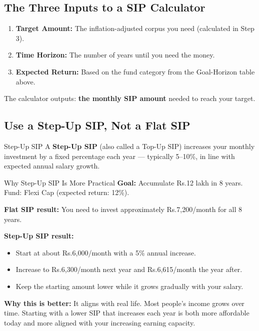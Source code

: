 \documentclass[12pt,a4paper]{article}
\makeatletter
\newcommand{\rupee}{\ifmmode\text{Rs.}\else Rs.\@\fi}
\makeatother
\begin{document}
\subsection{The Three Inputs to a SIP Calculator}

\begin{enumerate}[label=\textbf{\arabic*.}]
  \item \textbf{Target Amount:} The inflation-adjusted corpus you need (calculated in Step 3).
  \item \textbf{Time Horizon:} The number of years until you need the money.
  \item \textbf{Expected Return:} Based on the fund category from the Goal-Horizon table above.
\end{enumerate}

The calculator outputs: \textbf{the monthly SIP amount} needed to reach your target.

\subsection{Use a Step-Up SIP, Not a Flat SIP}

\begin{definitionbox}{Step-Up SIP}
A \textbf{Step-Up SIP} (also called a Top-Up SIP) increases your monthly investment by a fixed percentage each year --- typically 5--10\%, in line with expected annual salary growth.
\end{definitionbox}

\begin{examplebox}{Why Step-Up SIP Is More Practical}
\textbf{Goal:} Accumulate \rupee{}12 lakh in 8 years. Fund: Flexi Cap (expected return: 12\%).

\medskip
\textbf{Flat SIP result:} You need to invest approximately \rupee{}7,200/month for all 8 years.

\medskip
\textbf{Step-Up SIP result:}
\begin{itemize}
  \item Start at about \rupee{}6,000/month with a 5\% annual increase.
  \item Increase to \rupee{}6,300/month next year and \rupee{}6,615/month the year after.
  \item Keep the starting amount lower while it grows gradually with your salary.
\end{itemize}

\medskip
\textbf{Why this is better:} It aligns with real life. Most people's income grows over time. Starting with a lower SIP that increases each year is both more affordable today and more aligned with your increasing earning capacity.
\end{examplebox}
\end{document}
